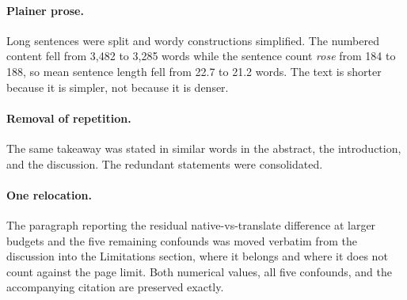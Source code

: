 \documentclass[11pt]{article}
\begin{document}
\paragraph{Plainer prose.} Long sentences were split and wordy constructions
simplified. The numbered content fell from 3{,}482 to 3{,}285 words while the
sentence count \emph{rose} from 184 to 188, so mean sentence length fell from
22.7 to 21.2 words. The text is shorter because it is simpler, not because it is
denser.

\paragraph{Removal of repetition.} The same takeaway was stated in similar words
in the abstract, the introduction, and the discussion. The redundant statements
were consolidated.

\paragraph{One relocation.} The paragraph reporting the residual
native-vs-translate difference at larger budgets and the five remaining
confounds was moved verbatim from the discussion into the Limitations section,
where it belongs and where it does not count against the page limit. Both
numerical values, all five confounds, and the accompanying citation are
preserved exactly.
\end{document}
